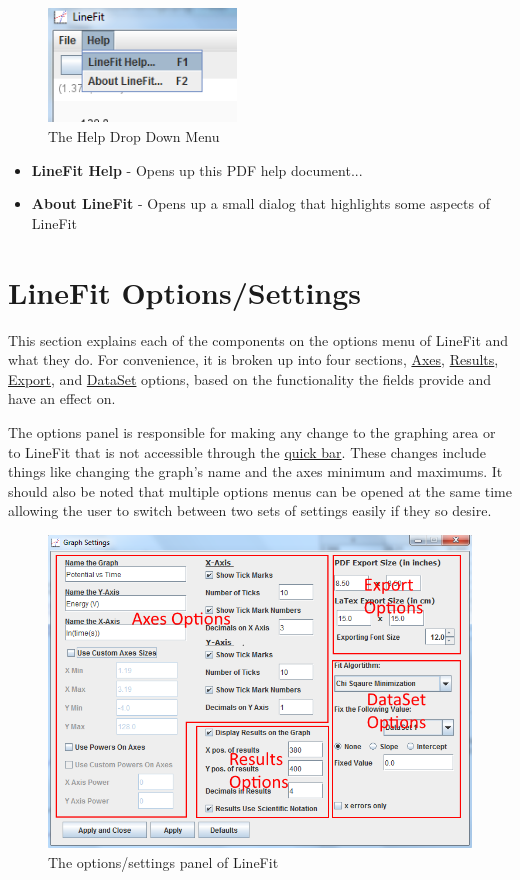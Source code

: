 \documentclass[titlepage,12pt]{article}
\begin{document}
\begin{figure}[ht!]
\centering
\includegraphics[width=5cm]{images/HelpMenu.png}
\caption{The Help Drop Down Menu}
\end{figure}

\begin{itemize}
\item \textbf{LineFit Help} - Opens up this PDF help document...
\item \textbf{About LineFit} - Opens up a small dialog that highlights some aspects of LineFit
\end{itemize}



\section{LineFit Options/Settings}
\label{sec:options}

This section explains each of the components on the options menu of LineFit and what they do. For convenience, it is broken up into four sections, \hyperref[subsec:axes]{Axes}, \hyperref[subsec:results]{Results}, \hyperref[subsec:export]{Export}, and \hyperref[subsec:dataset]{DataSet} options, based on the functionality the fields provide and have an effect on.

The options panel is responsible for making any change to the graphing area or to LineFit that is not accessible through the \hyperref[sec:quickbar]{quick bar}. These changes include things like changing the graph's name and the axes minimum and maximums. It should also be noted that multiple options menus can be opened at the same time allowing the user to switch between two sets of settings easily if they so desire.

\begin{figure}[ht!]
\centering
\includegraphics[width=15cm]{images/lineFitOptions.png}
\caption{The options/settings panel of LineFit}
\end{figure}
\end{document}
